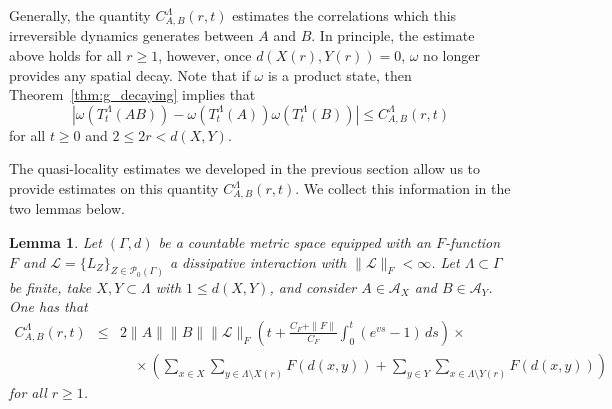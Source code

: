 \documentclass{article}
\newcommand{\A}{\mathcal{A}}
\newcommand{\<}{\langle}
\renewcommand{\>}{\rangle}
\numberwithin{equation}{section}
\newtheorem{lem}[thm]{Lemma}
\theoremstyle{definition}
\begin{document}
Generally, the quantity $C_{A,B}^{\Lambda}(r,t)$ estimates the correlations which 
this irreversible dynamics generates between $A$ and $B$. In principle, the estimate above holds for all $r \geq 1$, however,
once $d(X(r), Y(r))=0$, $\omega$ no longer provides any spatial decay. Note that if $\omega$ is a product state, then Theorem~\ref{thm:g_decaying} implies that 
\begin{equation}
|  \omega(T_t^{\Lambda}(AB)) - \omega(T_t^{\Lambda}(A)) \omega(T_t^{\Lambda}(B)) |  \leq C_{A,B}^{\Lambda}(r, t) 
\end{equation}
for all $t \geq 0$ and $2 \leq 2r < d(X,Y)$. 

The quasi-locality estimates we developed in the previous section allow us to provide estimates on this quantity $C_{A,B}^{\Lambda}(r,t)$. 
We collect this information in the two lemmas below.  

\begin{lem} \label{lem:gen_cor_dec} Let $(\Gamma, d)$ be a countable metric space equipped with an $F$-function $F$ and $\mathscr{L}= \{ L_Z \}_{Z \in \mathcal{P}_0(\Gamma)}$ a dissipative interaction with $\| \mathscr{L} \|_F< \infty$.
Let $\Lambda \subset \Gamma$ be finite, take $X,Y \subset \Lambda$ with $1 \leq d(X,Y)$, and consider $A \in \A_X$ and $B\in \A_Y$. One has that
\begin{eqnarray} \label{gen_cor_est}
C_{A,B}^{\Lambda}(r,t) & \leq & 2 \|A\| \| B \| \| \mathscr{L}\|_{F}  \left(t + \frac{C_{F}  +   \| F \|}{C_{F}} \int_0^t (e^{vs} -1) \, ds \right)  \times \nonumber \\
& \mbox{ } & \quad  \times \left(  \sum_{x \in X}   \sum_{y \in \Lambda \setminus X(r)} F(d(x,y)) +
 \sum_{y \in Y} \sum_{x \in \Lambda \setminus Y(r)} F(d(x,y)) \right) 
\end{eqnarray}
for all $r \geq 1$.
\end{lem}
\end{document}
